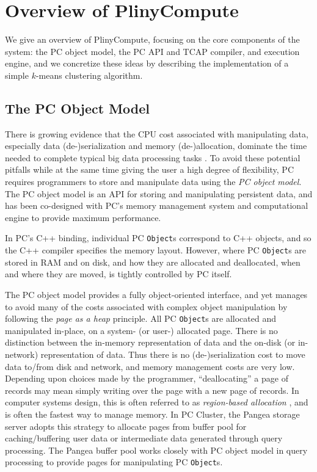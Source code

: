 
\section{Overview of PlinyCompute}

We give an overview of PlinyCompute, focusing on the core components of the
system: the PC object model, 
the PC API and TCAP compiler, and execution engine, and we concretize these ideas by
describing the implementation of a simple $k$-means clustering algorithm.

\subsection{The PC Object Model}

There is growing evidence that the CPU cost associated with manipulating data, especially data (de-)serialization and memory 
(de-)allocation,  
dominate the time needed to complete typical big data processing tasks \cite{ousterhout2015making}.
To avoid these potential pitfalls while at the same time giving the user a high degree of flexibility,
PC requires programmers to store and manipulate data using the \emph{PC object model}.
The PC object model is an API for storing and manipulating persistent
data, and has been co-designed with PC's memory management system and computational engine to provide
maximum performance.  

In PC's C++ binding, individual PC \texttt{Object}s correspond to C++ objects, and so the C++ compiler specifies the memory layout.
However, where PC \texttt{Object}s are stored in RAM and on disk, and how they are allocated and deallocated, when and where they are moved, is
tightly controlled by PC itself.

The PC object model provides a fully object-oriented interface, and yet manages to avoid many of the costs associated with complex object manipulation
by following the \emph{page as a heap} principle.  
All PC \texttt{Object}s are allocated and manipulated in-place, on a system-
(or user-) allocated page.  There is
no distinction between the in-memory representation of data and the on-disk (or in-network) representation of
data. Thus there is no (de-)serialization cost to move data to/from disk and network, and memory management costs are very low. Depending upon choices made by the
programmer, ``deallocating'' a page of records
may mean simply writing over the page with a new page of records.  
In computer systems design, this is often referred to as
\emph{region-based allocation} \cite{tofte1997region,
  grossman2002region}, and is often the fastest way to manage
memory. In PC Cluster, the Pangea storage server adopts this strategy to
allocate pages from buffer pool for caching/buffering user data or
intermediate data generated through query processing. The Pangea
buffer pool works closely with PC object model in query processing to
provide pages for manipulating PC \texttt{Object}s.

